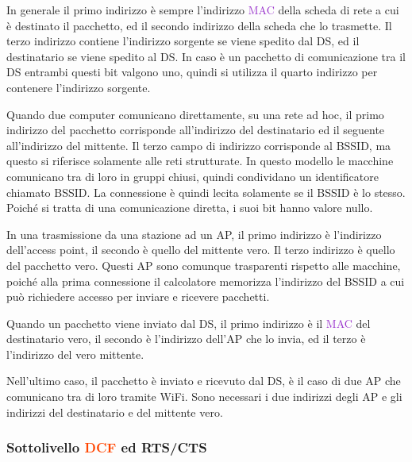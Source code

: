 \documentclass{article}
\numberwithin{equation}{subsection}
\begin{document}
In generale il primo indirizzo è sempre l'indirizzo \textcolor{DarkOrchid}{MAC} della scheda di rete a cui è destinato il pacchetto, ed il secondo indirizzo della scheda che lo trasmette. Il terzo indirizzo contiene l'indirizzo sorgente se viene spedito dal \textcolor{RawSienna}{DS}, ed il destinatario se viene spedito al \textcolor{RawSienna}{DS}. In caso è un pacchetto di comunicazione tra il \textcolor{RawSienna}{DS} entrambi questi bit valgono uno, quindi si utilizza il quarto indirizzo per contenere l'indirizzo sorgente. 

Quando due computer comunicano direttamente, su una rete ad hoc, il primo indirizzo del pacchetto corrisponde all'indirizzo del destinatario ed il seguente all'indirizzo 
del mittente. Il terzo campo di indirizzo corrisponde al \textcolor{Rhodamine}{BSSID}, ma questo si riferisce solamente alle reti strutturate. In questo modello le macchine comunicano tra di 
loro in gruppi chiusi, quindi condividano un identificatore chiamato \textcolor{Rhodamine}{BSSID}. La connessione è quindi lecita solamente se il \textcolor{Rhodamine}{BSSID} è lo stesso. Poiché si tratta di 
una comunicazione diretta, i suoi bit hanno valore nullo. 

In una trasmissione da una stazione ad un \textcolor{PineGreen}{AP}, il primo indirizzo è l'indirizzo dell'access point, il secondo è quello del mittente vero. Il terzo indirizzo è quello 
del pacchetto vero. Questi \textcolor{PineGreen}{AP} sono comunque trasparenti rispetto alle macchine, poiché alla prima connessione il calcolatore memorizza l'indirizzo del \textcolor{Rhodamine}{BSSID} a cui può 
richiedere accesso per inviare e ricevere pacchetti. 

Quando un pacchetto viene inviato dal \textcolor{RawSienna}{DS}, il primo indirizzo è il \textcolor{DarkOrchid}{MAC} del destinatario vero, il secondo è l'indirizzo dell'\textcolor{PineGreen}{AP} che lo invia, ed il terzo è l'indirizzo del 
vero mittente. 

Nell'ultimo caso, il pacchetto è inviato e ricevuto dal \textcolor{RawSienna}{DS}, è il caso di due \textcolor{PineGreen}{AP} che comunicano tra di loro tramite \textcolor{Sepia}{WiFi}. Sono necessari i due indirizzi degli \textcolor{PineGreen}{AP} e gli 
indirizzi del destinatario e del mittente vero. 

\subsubsection{Sottolivello \textcolor{OrangeRed}{DCF} ed \textcolor{Dandelion}{RTS}/\textcolor{Dandelion}{CTS}}
\end{document}
